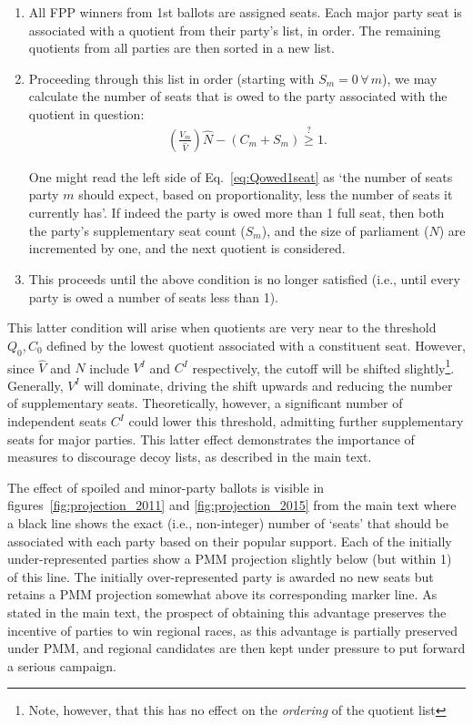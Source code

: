 \begin{enumerate}
\item All FPP winners from 1st ballots are assigned seats.
Each major party seat is associated with a quotient from their party's list, in order. The remaining quotients from all parties are then sorted in a new list.

\item Proceeding through this list in order (starting with $S_m=0 \, \forall \, m$), we may calculate the number of seats that is owed to the party associated with the quotient in question:
\begin{align}
\left(\frac{V_m}{\hat{V}}\right) \hat{N} -(C_m+S_m)\stackrel{?}{\ge} 1.
\label{eq:Qowed1seat}
\end{align}

One might read the left side of Eq.~\ref{eq:Qowed1seat} as `the number of seats party $m$ should expect, based on proportionality, less the number of seats it currently has'.
If indeed the party is owed more than 1 full seat, then both the party's supplementary seat count ($S_m$), and the size of parliament ($\hat{N}$) are incremented by one, and the next quotient is considered.

\item This proceeds until the above condition is no longer satisfied (i.e., until every party is owed a number of seats less than 1).
\end{enumerate}

This latter condition will arise when quotients are very near to the threshold $Q_0,C_0$ defined by the lowest quotient associated with a  constituent seat. However, since $\hat{V}$ and $\hat{N}$ include $V^I$ and $C^I$ respectively, the cutoff will be shifted slightly\footnote{Note, however, that this has no effect on the \emph{ordering} of the quotient list}.
Generally, $V^I$ will dominate, driving the shift upwards and reducing the number of supplementary seats.
Theoretically, however, a significant number of independent seats $C^I$ could lower this threshold, admitting further supplementary seats for major parties. 
This latter effect demonstrates the importance of measures to discourage decoy lists, as described in the main text.

The effect of spoiled and minor-party ballots is visible in figures~\ref{fig:projection_2011} and \ref{fig:projection_2015} from the main text where a black line shows the exact (i.e., non-integer) number of `seats' that should be associated with each party based on their popular support.
Each of the initially under-represented parties show a PMM projection slightly below (but within 1) of this line. The initially over-represented party is awarded no new seats but retains a PMM projection somewhat above its corresponding marker line.
As stated in the main text, the prospect of obtaining this advantage preserves the incentive of parties to win regional races, as this advantage is partially preserved under PMM, and regional candidates are then kept under pressure to put forward a serious campaign.

